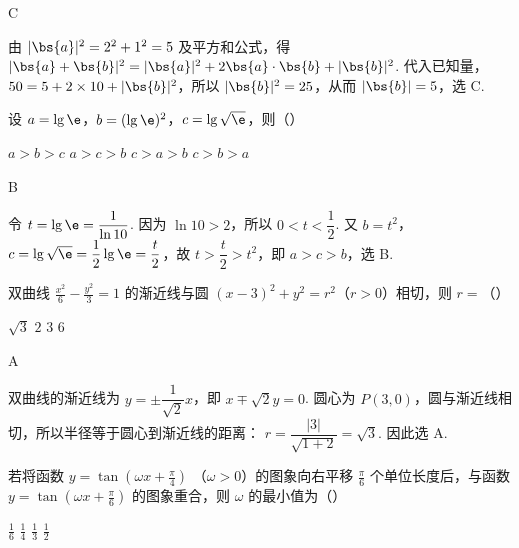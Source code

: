 \begin{answer}
C
\end{answer}

\begin{solution}
由 \(|\bs{a}|^2=2^2+1^2=5\) 及平方和公式，得
\(|\bs{a}+\bs{b}|^2=|\bs{a}|^2+2\bs{a}\cdot\bs{b}+|\bs{b}|^2\). 代入已知量，\(50=5+2\times10+|\bs{b}|^2\)，所以 \(|\bs{b}|^2=25\)，从而 \(|\bs{b}|=5\)，选 C.
\end{solution}

\begin{problem}
设 \(a = \lg \e\)，\(b = (\lg \e)^2\)，\(c = \lg \sqrt{\e}\)，则（\quad）

\choices
    {\(a > b > c\)}
    {\(a > c > b\)}
    {\(c > a > b\)}
    {\(c > b > a\)}
\end{problem}

\begin{answer}
B
\end{answer}

\begin{solution}
令 \(t=\lg\e=\dfrac1{\ln10}\). 因为 \(\ln10>2\)，所以 \(0<t<\dfrac12\). 又 \(b=t^2\)，\(c=\lg\sqrt{\e}=\dfrac12\lg\e=\dfrac t2\)，故 \(t>\dfrac t2>t^2\)，即 \(a>c>b\)，选 B.
\end{solution}

\begin{problem}
双曲线 \(\frac{x^2}{6} - \frac{y^2}{3} = 1\) 的渐近线与圆 \((x - 3)^2 + y^2 = r^2\)（\(r > 0\)）相切，则 \(r =\)（\quad）

\choices
    {\(\sqrt{3}\)}
    {\(2\)}
    {\(3\)}
    {\(6\)}
\end{problem}

\begin{answer}
A
\end{answer}

\begin{solution}
双曲线的渐近线为 \(y=\pm\dfrac1{\sqrt2}x\)，即 \(x\mp\sqrt2y=0\). 圆心为 \(P(3,0)\)，圆与渐近线相切，所以半径等于圆心到渐近线的距离：
\(r=\dfrac{|3|}{\sqrt{1+2}}=\sqrt3\). 因此选 A.
\end{solution}

\begin{problem}
若将函数 \( y = \tan \left( \omega x + \frac{\pi}{4} \right) \) （\(\omega > 0\)）的图象向右平移 \( \frac{\pi}{6} \) 个单位长度后，与函数 \( y = \tan \left( \omega x + \frac{\pi}{6} \right) \) 的图象重合，则 \( \omega \) 的最小值为（\quad）

\choices
    {\(\frac{1}{6}\)}
    {\(\frac{1}{4}\)}
    {\(\frac{1}{3}\)}
    {\(\frac{1}{2}\)}
\end{problem}

